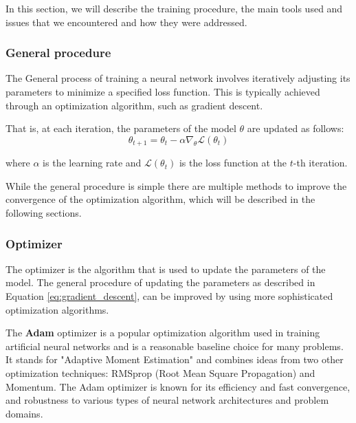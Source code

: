 \documentclass[a4paper, twoside]{report}
\theoremstyle{definition}
\numberwithin{equation}{section}
\begin{document}
In this section, we will describe the training procedure,
the main tools used and issues that we encountered and how they were addressed.

\subsubsection{General procedure}

The General process of training a neural network involves iteratively adjusting its
parameters to minimize a specified loss function.
This is typically achieved through an optimization algorithm, such as gradient descent.

That is, at each iteration, the parameters of the model $\theta$ are updated as follows:
\begin{equation} \label{eq:gradient_descent}
    \theta_{t+1}=\theta_t - \alpha \nabla_{\theta} \mathcal{L}(\theta_t)
\end{equation}

where $\alpha$ is the learning rate and $\mathcal{L}(\theta_t)$ is the loss function at the $t$-th iteration.

While the general procedure is simple there are multiple methods to improve the convergence of the optimization algorithm,
which will be described in the following sections.

\subsubsection{Optimizer} \label{sec:optimizer}

The optimizer is the algorithm that is used to update the parameters of the model.
The general procedure of updating the parameters as described in Equation \ref{eq:gradient_descent},
can be improved by using more sophisticated optimization algorithms.

The \textbf{Adam} optimizer is a popular optimization algorithm used in training artificial neural networks
and is a reasonable baseline choice for many problems.
It stands for "Adaptive Moment Estimation" and combines ideas from two other
optimization techniques: RMSprop (Root Mean Square Propagation) and Momentum.
The Adam optimizer is known for its efficiency and  fast convergence, and robustness
to various types of neural network architectures and problem domains.
\end{document}
